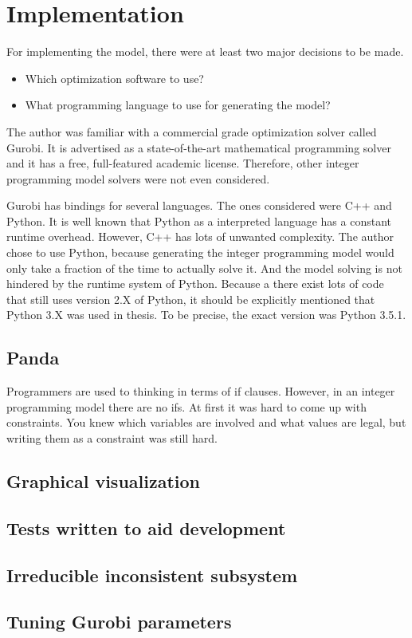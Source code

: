 \section{Implementation}
For implementing the model, there were at least two major decisions to be made.
\begin{itemize}
    \item Which optimization software to use?
    \item What programming language to use for generating the model?
\end{itemize}
The author was familiar with a commercial grade optimization solver called
Gurobi\cite{gurobi}. It is advertised as a state-of-the-art mathematical
programming solver and it has a free, full-featured academic license.
Therefore, other integer programming model solvers were not even considered.

Gurobi has bindings for several languages. The ones considered were C++ and
Python. It is well known that Python as a interpreted language has a constant
runtime overhead. However, C++ has lots of unwanted complexity. The author
chose to use Python, because generating the integer programming model would
only take a fraction of the time to actually solve it. And the model solving
is not hindered by the runtime system of Python. Because a there exist lots of
code that still uses version 2.X of Python, it should be explicitly
mentioned that Python 3.X was used in thesis. To be precise, the exact version
was Python 3.5.1.
\subsection{Panda}
Programmers are used to thinking in terms of if clauses. However, in an integer
programming model there are no ifs. At first it was hard to come up with
constraints. You knew which variables are involved and what values are legal,
but writing them as a constraint was still hard.
\subsection{Graphical visualization}
\subsection{Tests written to aid development}
\subsection{Irreducible inconsistent subsystem}
\subsection{Tuning Gurobi parameters}
